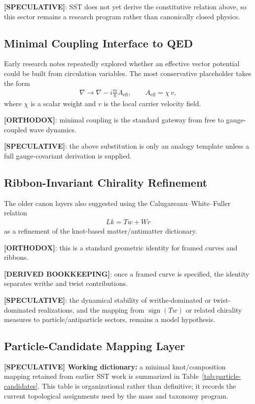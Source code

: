 \textbf{[SPECULATIVE]}: SST does not yet derive the constitutive relation above, so this sector remains a research program rather than canonically closed physics.

\subsection{Minimal Coupling Interface to QED}
Early research notes repeatedly explored whether an effective vector potential could be built from circulation variables. The most conservative placeholder takes the form
\begin{align}
    \nabla \rightarrow \nabla - i\frac{m}{\hbar}A_{\mathrm{eff}},
    \qquad
    A_{\mathrm{eff}} = \chi \, v,
\end{align}
where $\chi$ is a scalar weight and $v$ is the local carrier velocity field.

\textbf{[ORTHODOX]}: minimal coupling is the standard gateway from free to gauge-coupled wave dynamics.

\textbf{[SPECULATIVE]}: the above substitution is only an analogy template unless a full gauge-covariant derivation is supplied.

\subsection{Ribbon-Invariant Chirality Refinement}
The older canon layers also suggested using the Calugareanu--White--Fuller relation
\begin{align}
    Lk = Tw + Wr
\end{align}
as a refinement of the knot-based matter/antimatter dictionary.

\textbf{[ORTHODOX]}: this is a standard geometric identity for framed curves and ribbons.

\textbf{[DERIVED BOOKKEEPING]}: once a framed curve is specified, the identity separates writhe and twist contributions.

\textbf{[SPECULATIVE]}: the dynamical stability of writhe-dominated or twist-dominated realizations, and the mapping from $\operatorname{sign}(Tw)$ or related chirality measures to particle/antiparticle sectors, remains a model hypothesis.

\subsection{Particle-Candidate Mapping Layer}
\textbf{[SPECULATIVE] Working dictionary:} a minimal knot/composition mapping retained from earlier SST work is summarized in Table~\ref{tab:particle-candidates}. This table is organizational rather than definitive; it records the current topological assignments used by the mass and taxonomy program.

